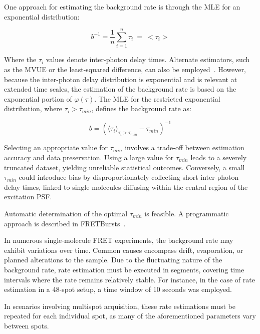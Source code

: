 One approach for estimating the background rate is through the \ac{MLE} for an exponential distribution:

\begin{equation}
\label{eqn:b_inverse}
b^{-1}=\frac{1}{n}\sum_{i=1}^n\tau_i\ =\ <\tau_i>
\end{equation}

\noindent
Where the $\tau_i$ values denote inter-photon delay times. 
Alternate estimators, such as the \ac{MVUE} or the least-squared difference, can also be employed~\cite{ingargiola_PLOS1_2016}. 
However, because the inter-photon delay distribution is exponential and is relevant at extended time scales, the estimation of the background rate is based on the exponential portion of $\varphi(\tau)$. 
The \ac{MLE} for the restricted exponential distribution, where $\tau_i > \tau_{min}$, defines the background rate as:

\begin{equation}
\label{eqn:tau_MLE}
b = \left(\langle \tau_i\rangle_{\tau_i > \tau_{min}} - \tau_{min}\right)^{-1}
\end{equation}

\noindent
Selecting an appropriate value for $\tau_{min}$ involves a trade-off between estimation accuracy and data preservation. 
Using a large value for $\tau_{min}$ leads to a severely truncated dataset, yielding unreliable statistical outcomes. 
Conversely, a small $\tau_{min}$ could introduce bias by disproportionately collecting short inter-photon delay times, linked to single molecules diffusing within the central region of the excitation \ac{PSF}.

Automatic determination of the optimal $\tau_{min}$ is feasible.
A programmatic approach is described in FRETBursts~\cite{ingargiola_PLOS1_2016}.

In numerous single-molecule FRET experiments, the background rate may exhibit variations over time. 
Common causes encompass drift, evaporation, or planned alterations to the sample. 
Due to the fluctuating nature of the background rate, rate estimation must be executed in segments, covering time intervals where the rate remains relatively stable. 
For instance, in the case of rate estimation in a 48-spot setup, a time window of 10 seconds was employed.

In scenarios involving multispot acquisition, these rate estimations must be repeated for each individual spot, as many of the aforementioned parameters vary between spots. 

